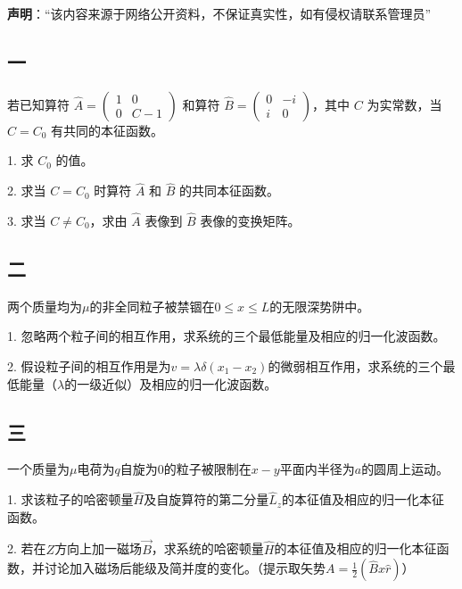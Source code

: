 
\textbf{声明}：“该内容来源于网络公开资料，不保证真实性，如有侵权请联系管理员”

\subsection{一}
若已知算符 $\hat{A} = \begin{pmatrix}
1 & 0 \\
0 & C - 1
\end{pmatrix}$ 和算符 $\hat{B} = \begin{pmatrix}
0 & -i \\
i & 0
\end{pmatrix}$，其中 $C$ 为实常数，当 $C = C_0$ 有共同的本征函数。

1. 求 $C_0$ 的值。

2. 求当 $C = C_0$ 时算符 $\hat{A}$ 和 $\hat{B}$ 的共同本征函数。

3. 求当 $C \neq C_0$，求由 $\hat{A}$ 表像到 $\hat{B}$ 表像的变换矩阵。

\subsection{二}
两个质量均为$\mu$的非全同粒子被禁锢在$0 \le x \le L$的无限深势阱中。

1. 忽略两个粒子间的相互作用，求系统的三个最低能量及相应的归一化波函数。

2. 假设粒子间的相互作用是为$v = \lambda \delta (x_1 - x_2)$的微弱相互作用，求系统的三个最低能量（$\lambda$的一级近似）及相应的归一化波函数。

\subsection{三}
一个质量为$\mu$电荷为$q$自旋为$0$的粒子被限制在$x-y$平面内半径为$a$的圆周上运动。

1. 求该粒子的哈密顿量$\hat H$及自旋算符的第二分量$\hat{L}_z$的本征值及相应的归一化本征函数。

2. 若在$Z$方向上加一磁场$\vec{B}$，求系统的哈密顿量$\hat{H}$的本征值及相应的归一化本征函数，并讨论加入磁场后能级及简并度的变化。（提示取矢势$A=\frac{1}{2}(\hat{B} x\hat{r})$）
